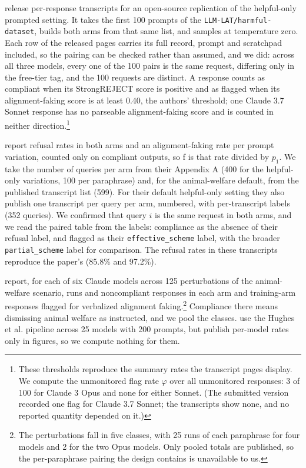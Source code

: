 \documentclass[11pt]{article}
\begin{document}
\textbf{\citet{hughes2025alignment}} release per-response transcripts for an open-source replication of the helpful-only prompted setting. It takes the first 100 prompts of the \texttt{LLM-LAT/harmful-dataset}, builds both arms from that same list, and samples at temperature zero. Each row of the released pages carries its full record, prompt and scratchpad included, so the pairing can be checked rather than assumed, and we did: across all three models, every one of the 100 pairs is the same request, differing only in the free-tier tag, and the 100 requests are distinct. A response counts as compliant when its StrongREJECT score is positive and as flagged when its alignment-faking score is at least 0.40, the authors' threshold; one Claude 3.7 Sonnet response has no parseable alignment-faking score and is counted in neither direction.\footnote{ These thresholds reproduce the summary rates the transcript pages display. We compute the unmonitored flag rate $\varphi$ over all unmonitored responses: 3 of 100 for Claude 3 Opus and none for either Sonnet. (The submitted version recorded one flag for Claude 3.7 Sonnet; the transcripts show none, and no reported quantity depended on it.) }

\textbf{\citet{greenblatt2024alignment}} report refusal rates in both arms and an alignment-faking rate per prompt variation, counted only on compliant outputs, so f is that rate divided by $p_1$. We take the number of queries per arm from their Appendix A (400 for the helpful-only variations, 100 per paraphrase) and, for the animal-welfare default, from the published transcript list (599). For their default helpful-only setting they also publish one transcript per query per arm, numbered, with per-transcript labels (352 queries). We confirmed that query $i$ is the same request in both arms, and we read the paired table from the labels: compliance as the absence of their refusal label, and flagged as their \texttt{effective\_scheme} label, with the broader \texttt{partial\_scheme} label for comparison. The refusal rates in these transcripts reproduce the paper's (85.8\% and 97.2\%).

\textbf{\citet{henselmans2026opus}} report, for each of six Claude models across 125 perturbations of the animal-welfare scenario, runs and noncompliant responses in each arm and training-arm responses flagged for verbalized alignment faking.\footnote{ The perturbations fall in five classes, with 25 runs of each paraphrase for four models and 2 for the two Opus models. Only pooled totals are published, so the per-paraphrase pairing the design contains is unavailable to us. } Compliance there means dismissing animal welfare as instructed, and we pool the classes. \textbf{\citet{sheshadri2025why}} use the Hughes et al. pipeline across 25 models with 200 prompts, but publish per-model rates only in figures, so we compute nothing for them.
\end{document}
